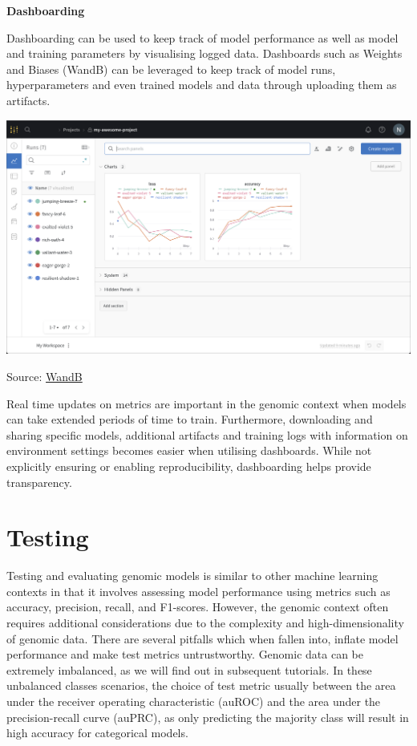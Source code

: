 \documentclass[
]{book}
\begin{document}
\textbf{Dashboarding}

Dashboarding can be used to keep track of model performance as well as model and training parameters by visualising logged data. Dashboards such as Weights and Biases (WandB) can be leveraged to keep track of model runs, hyperparameters and even trained models and data through uploading them as artifacts.

\includegraphics{images/wandb.png}

Source: \href{https://docs.wandb.ai/quickstart}{WandB}

Real time updates on metrics are important in the genomic context when models can take extended periods of time to train. Furthermore, downloading and sharing specific models, additional artifacts and training logs with information on environment settings becomes easier when utilising dashboards. While not explicitly ensuring or enabling reproducibility, dashboarding helps provide transparency.

\chapter{Testing}\label{testing}

Testing and evaluating genomic models is similar to other machine learning contexts in that it involves assessing model performance using metrics such as accuracy, precision, recall, and F1-scores. However, the genomic context often requires additional considerations due to the complexity and high-dimensionality of genomic data. There are several pitfalls which when fallen into, inflate model performance and make test metrics untrustworthy. Genomic data can be extremely imbalanced, as we will find out in subsequent tutorials. In these unbalanced classes scenarios, the choice of test metric usually between the area under the receiver operating characteristic (auROC) and the area under the precision-recall curve (auPRC), as only predicting the majority class will result in high accuracy for categorical models.
\end{document}
